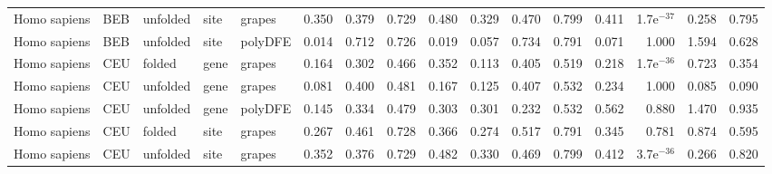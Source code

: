 \begin{longtable}{lllllrrrrrrrrrrr}
        Homo sapiens &                       BEB &  unfolded &  site &   grapes &                              0.350 &                               0.379 &                 0.729 &                 0.480 &                              0.329 &                               0.470 &                 0.799 &                 0.411 &  1.7e$^{-37}$ &  0.258 &  0.795 \\
        Homo sapiens &                       BEB &  unfolded &  site &  polyDFE &                              0.014 &                               0.712 &                 0.726 &                 0.019 &                              0.057 &                               0.734 &                 0.791 &                 0.071 &         1.000 &  1.594 &  0.628 \\
        Homo sapiens &                       CEU &    folded &  gene &   grapes &                              0.164 &                               0.302 &                 0.466 &                 0.352 &                              0.113 &                               0.405 &                 0.519 &                 0.218 &  1.7e$^{-36}$ &  0.723 &  0.354 \\
        Homo sapiens &                       CEU &  unfolded &  gene &   grapes &                              0.081 &                               0.400 &                 0.481 &                 0.167 &                              0.125 &                               0.407 &                 0.532 &                 0.234 &         1.000 &  0.085 &  0.090 \\
        Homo sapiens &                       CEU &  unfolded &  gene &  polyDFE &                              0.145 &                               0.334 &                 0.479 &                 0.303 &                              0.301 &                               0.232 &                 0.532 &                 0.562 &         0.880 &  1.470 &  0.935 \\
        Homo sapiens &                       CEU &    folded &  site &   grapes &                              0.267 &                               0.461 &                 0.728 &                 0.366 &                              0.274 &                               0.517 &                 0.791 &                 0.345 &         0.781 &  0.874 &  0.595 \\
        Homo sapiens &                       CEU &  unfolded &  site &   grapes &                              0.352 &                               0.376 &                 0.729 &                 0.482 &                              0.330 &                               0.469 &                 0.799 &                 0.412 &  3.7e$^{-36}$ &  0.266 &  0.820 \\

\end{longtable}
